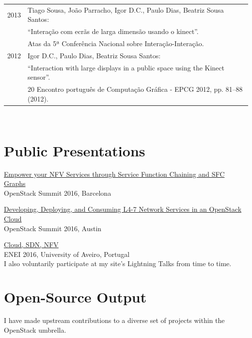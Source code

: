\documentclass[letter,10pt]{article} %
\begin{document}
\begin{tabular}{rl}
\textsc{2013} & Tiago Sousa, João Parracho, Igor D.C., Paulo Dias, Beatriz Sousa Santos: \\
& ``Interação com ecrãs de larga dimensão usando o kinect''. \\
& Atas da 5ª Conferência Nacional sobre Interação-Interação. \normalsize\\

\textsc{2012} & Igor D.C., Paulo Dias, Beatriz Sousa Santos: \\
& ``Interaction with large displays in a public space using the Kinect sensor''. \\
& 20 Encontro português de Computação Gráfica - EPCG 2012, pp. 81–88 (2012). \normalsize\\

\end{tabular} \\


\section{Public Presentations}
\href{https://www.slideshare.net/igordcard/empower-your-nfv-services-through-service-function-chaining-and-sfc-graphs}{Empower your NFV Services through Service Function Chaining and SFC Graphs}\\
OpenStack Summit 2016, Barcelona

\href{https://www.slideshare.net/igordcard/developing-deploying-and-consuming-l47-network-services-in-an-openstack-cloud}{Developing, Deploying, and Consuming L4-7 Network Services in an OpenStack Cloud}\\
OpenStack Summit 2016, Austin

\href{https://www.slideshare.net/igordcard/cloud-sdn-nfv}{Cloud, SDN, NFV}\\
ENEI 2016, University of Aveiro, Portugal\\

I also voluntarily participate at my site's Lightning Talks from time to time.


\section{Open-Source Output}
I have made upstream contributions to a diverse set of projects within the OpenStack umbrella.
\end{document}
